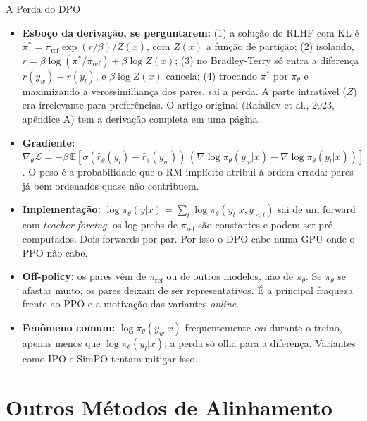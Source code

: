 \documentclass[aspectratio=169, xcolor=dvipsnames]{beamer}
\begin{document}
\begin{frame}{A Perda do DPO \cite{rafailov2023dpo}}
{    \begin{itemize}
      \item \textbf{Esboço da derivação, se perguntarem:} (1) a solução do RLHF com KL é $\pi^* = \pi_{\text{ref}}\exp(r/\beta)/Z(x)$, com $Z(x)$ a função de partição; (2) isolando, $r = \beta\log(\pi^*/\pi_{\text{ref}}) + \beta\log Z(x)$; (3) no Bradley-Terry só entra a diferença $r(y_w) - r(y_l)$, e $\beta\log Z(x)$ cancela; (4) trocando $\pi^*$ por $\pi_\theta$ e maximizando a verossimilhança dos pares, sai a perda. A parte intratável ($Z$) era irrelevante para preferências. O artigo original (Rafailov et al., 2023, apêndice A) tem a derivação completa em uma página.
      \item \textbf{Gradiente:} $\nabla_\theta\mathcal{L} = -\beta\,\mathbb{E}[\sigma(\hat r_\theta(y_l) - \hat r_\theta(y_w))\,(\nabla\log\pi_\theta(y_w|x) - \nabla\log\pi_\theta(y_l|x))]$. O peso é a probabilidade que o RM implícito atribui à ordem errada: pares já bem ordenados quase não contribuem.
      \item \textbf{Implementação:} $\log\pi_\theta(y|x) = \sum_t\log\pi_\theta(y_t|x,y_{<t})$ sai de um forward com \textit{teacher forcing}; os log-probs de $\pi_{\text{ref}}$ são constantes e podem ser pré-computados. Dois forwards por par. Por isso o DPO cabe numa GPU onde o PPO não cabe.
      \item \textbf{Off-policy:} os pares vêm de $\pi_{\text{ref}}$ ou de outros modelos, não de $\pi_\theta$. Se $\pi_\theta$ se afastar muito, os pares deixam de ser representativos. É a principal fraqueza frente ao PPO e a motivação das variantes \textit{online}.
      \item \textbf{Fenômeno comum:} $\log\pi_\theta(y_w|x)$ frequentemente \emph{cai} durante o treino, apenas menos que $\log\pi_\theta(y_l|x)$; a perda só olha para a diferença. Variantes como IPO e SimPO tentam mitigar isso.
    \end{itemize}
  }
  \end{frame}

  \section{Outros Métodos de Alinhamento}
\end{document}
